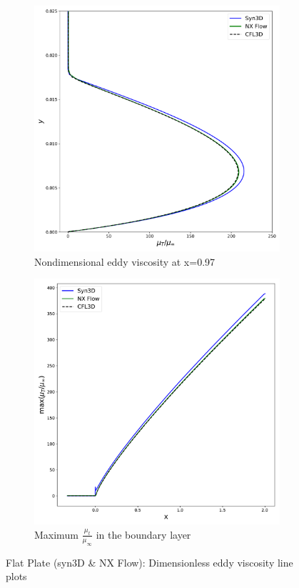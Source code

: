 \begin{figure}[ht!]
\centering
\begin{subfigure}{.45\textwidth}
  \centering
  \includegraphics[width=1.0\textwidth]{figs/flat/mut_x097.pdf}
  \caption{Nondimensional eddy viscosity at x=0.97 }
\end{subfigure}%
\begin{subfigure}{.45\textwidth}
  \centering
  \includegraphics[width=1.0\textwidth]{figs/flat/maxmut.pdf}
  \caption{Maximum $\frac{\mu_t}{\mu_{\infty}}$ in the boundary layer}
  \label{fig:flatmutmax}
\end{subfigure}
\caption{Flat Plate (syn3D \& NX Flow): Dimensionless eddy viscosity line plots}
\label{fig:flatmu}
\end{figure}

